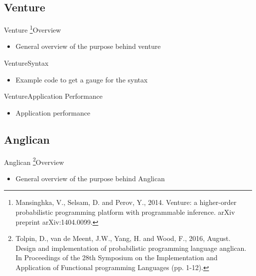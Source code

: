 \documentclass[AERbeamer%
              ,optEnglish%
              ,optBiber%
              ,optBibstyleAlphabetic%
              ,optBeamerClassicFormat%
              ]{AERlatex}%
\begin{document}
\subsection{Venture}
\begin{frame}[c]{Venture \footnote{Mansinghka, V., Selsam, D. and Perov, Y., 2014.
                                   Venture: a higher-order probabilistic programming platform
                                   with programmable inference. arXiv preprint arXiv:1404.0099.}}{Overview}
    \centering
    \begin{itemize}
        \item General overview of the purpose behind venture
    \end{itemize}
\end{frame}


\begin{frame}[c]{Venture}{Syntax}
    \centering
    \begin{itemize}
        \item Example code to get a gauge for the syntax
    \end{itemize}
\end{frame}


\begin{frame}[c]{Venture}{Application Performance}
    \centering
    \begin{itemize}
        \item Application performance
    \end{itemize}
\end{frame}


\subsection{Anglican}
\begin{frame}[c]{Anglican \footnote{Tolpin, D., van de Meent, J.W., Yang, H. and Wood, F., 2016, August. Design
                                    and implementation of probabilistic programming language anglican. In Proceedings
                                    of the 28th Symposium on the Implementation and Application of Functional
                                    programming Languages (pp. 1-12).}}{Overview}
    \centering
    \begin{itemize}
        \item General overview of the purpose behind Anglican
    \end{itemize}
\end{frame}
\end{document}

